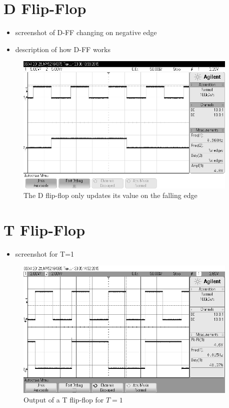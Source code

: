 \documentclass[11pt]{article}
\begin{document}
\section{D Flip-Flop}
\begin{itemize}
	\item screenshot of D-FF changing on negative edge
	\item description of how D-FF works
\end{itemize}

\begin{figure}[htpb]
	\centering
	\includegraphics[width=0.95\textwidth]{d-ff}
	\caption{The D flip-flop only updates its value on the falling edge}
	\label{fig:d-ff}
\end{figure}

\section{T Flip-Flop}
\begin{itemize}
	\item screenshot for T=1
\end{itemize}

\begin{figure}[htpb]
	\centering
	\includegraphics[width=0.95\textwidth]{t-ff}
	\caption{Output of a T flip-flop for $T=1$}
	\label{fig:t-ff}
\end{figure}
\end{document}
